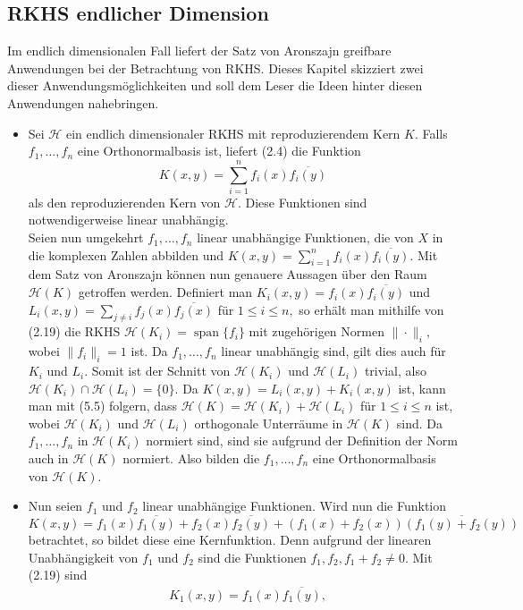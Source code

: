 \documentclass[12pt,titlepage,twoside,cleardoublepage]{article}
\theoremstyle{nummermitklammern}
\numberwithin{equation}{section}
\DeclareMathOperator{\Span}{span}
\begin{document}
\subsection{RKHS endlicher Dimension}
Im endlich dimensionalen Fall liefert der Satz von Aronszajn greifbare Anwendungen bei der Betrachtung von RKHS. Dieses Kapitel skizziert zwei dieser Anwendungsmöglichkeiten und soll dem Leser die Ideen hinter diesen Anwendungen nahebringen.
\begin{itemize}
\item
Sei $\mathcal{H}$ ein endlich dimensionaler RKHS mit reproduzierendem Kern $K$. Falls $f_1,\ldots ,f_n $ eine Orthonormalbasis ist, liefert (2.4) die Funktion
\[
K(x,y)=\sum^n_{i=1} f_i(x)\overline{f_i(y)}
\] als den reproduzierenden Kern von $\mathcal{H}.$
Diese Funktionen sind notwendigerweise linear unabhängig. \\
 Seien nun umgekehrt $f_1,\ldots,f_n$ linear unabhängige Funktionen, die von $X$ in die komplexen Zahlen abbilden und $K(x,y)=\sum_{i=1}^nf_i(x)\overline{f_i(y)}.$ Mit dem Satz von Aronszajn können nun genauere Aussagen über den Raum $\mathcal{H}(K)$ getroffen werden. Definiert man $K_i(x,y)=f_i(x)\overline{f_i(y)}$ und $L_i(x,y)=\sum_{j\neq i} f_j(x)\overline{f_j(x)}$ für $1\leq i\leq n,$
   so erhält man mithilfe von (2.19) die RKHS $\mathcal{H}(K_i)=\Span\{f_i\}$ mit zugehörigen Normen $\|\cdot\|_i,$ wobei $\|f_i\|_i=1$ ist. Da $f_1,\ldots,f_n$  linear unabhängig sind, gilt dies auch für $K_i$ und $L_i.$ Somit ist der Schnitt von $\mathcal{H}(K_i)$ und $\mathcal{H}(L_i)$ trivial, also $\mathcal{H}(K_i)\cap \mathcal{H}(L_i)=\{0\}.$ Da $K(x,y)=L_i(x,y)+K_i(x,y)$ ist, kann man mit (5.5) folgern, dass $\mathcal{H}(K)=\mathcal{H}(K_i)+\mathcal{H}(L_i)$ für $1\leq i\leq n$ ist, wobei $\mathcal{H}(K_i)$ und $\mathcal{H}(L_i)$ orthogonale Unterräume in $\mathcal{H}(K)$ sind. Da $f_1,\ldots,f_n$ in $\mathcal{H}(K_i)$ normiert sind, sind sie aufgrund der Definition der Norm auch in $\mathcal{H}(K)$ normiert. Also bilden die $f_1,\ldots,f_n$ eine Orthonormalbasis von $\mathcal{H}(K).$ 
\item Nun seien $f_1$ und $f_2$ linear unabhängige Funktionen. Wird nun die Funktion 
$K(x,y)=f_1(x)\overline{f_1(y)}+f_2(x)\overline{f_2(y)}+(f_1(x)+f_2(x))\overline{(f_1(y)+f_2(y))}$ betrachtet,
so bildet diese eine Kernfunktion. Denn aufgrund der linearen Unabhängigkeit von $f_1$ und $f_2$ sind die Funktionen $f_1,f_2,f_1+f_2\neq 0.$ Mit (2.19) sind 
\begin{align*}
&K_1(x,y)=f_1(x)\overline{f_1(y)},\\

\end{align*}
\end{itemize}
\end{document}
